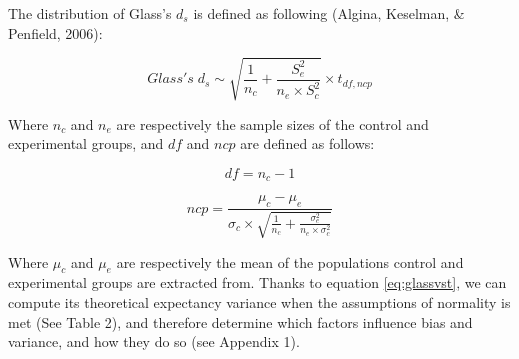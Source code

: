 \documentclass[
  man,floatsintext]{apa6}
\begin{document}
The distribution of Glass's \(d_{s}\) is defined as following (Algina, Keselman, \& Penfield, 2006):

\begin{equation} 
Glass's \; d_s \sim \sqrt{\frac{1}{n_{c}}+\frac{S_{e}^2}{n_{e} \times S^2_{c}}} \times t_{df,ncp}
\label{eq:glassvst}
\end{equation}

Where \(n_c\) and \(n_e\) are respectively the sample sizes of the control and experimental groups, and \(df\) and \(ncp\) are defined as follows:

\begin{equation} 
df = n_{c}-1
\label{eq:glassdf}
\end{equation}

\begin{equation} 
ncp = \frac{\mu_{c}-\mu_{e}}{\sigma_{c} \times \sqrt{\frac{1}{n_{c}} + \frac{\sigma_{e}^2}{n_{e} \times \sigma^2_{c}}}}
\label{eq:glassdf}
\end{equation}

Where \(\mu_c\) and \(\mu_e\) are respectively the mean of the populations control and experimental groups are extracted from. Thanks to equation \ref{eq:glassvst}, we can compute its theoretical expectancy variance when the assumptions of normality is met (See Table 2), and therefore determine which factors influence bias and variance, and how they do so (see Appendix 1).
\end{document}
